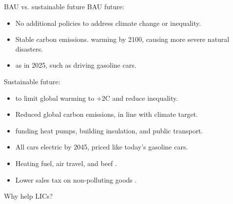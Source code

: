 \documentclass[aspectratio=169,xcolor=dvipsnames, 11pt,mathserif]{beamer}
\begin{document}
\begin{frame}{BAU vs. sustainable future}
BAU future:
\begin{itemize}
    \item No additional policies to address climate change or inequality. 
    \item Stable carbon emissions.  warming by 2100, causing more severe natural disasters.
    \item {} as in 2025, such as driving gasoline cars.
\end{itemize}
Sustainable future:
\begin{itemize}
    \item {} to limit global warming to +2\textdegree{}C and reduce inequality.
    \item Reduced global carbon emissions, in line with climate target.
    \item {} funding heat pumps, building insulation, and public transport.
    \item All cars electric by 2045, priced like today's gasoline cars.
    \item Heating fuel, air travel, and beef . 
    \item Lower sales tax on non-polluting goods .
\end{itemize}
\end{frame}

\begin{frame}{Why help LICs?}
\end{frame}
\end{document}
